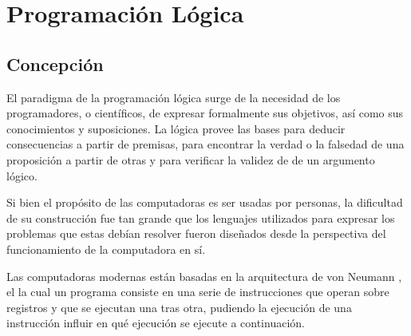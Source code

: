 \documentclass[12pt,titlepage]{article}
\begin{document}

\setcounter{page}{1}

\tableofcontents
\newpage



\clearpage	

\setlength{\parindent}{0pt}
\setlength{\parskip}{2ex plus 0.5ex minus 0.2ex}

\hypersetup{
linkcolor=red
}



\section{Programación Lógica}
\subsection{Concepción}

El paradigma de la programación lógica surge de la necesidad de los programadores, o científicos, de expresar formalmente sus objetivos, así como sus conocimientos y suposiciones. La lógica provee las bases para deducir consecuencias a partir de premisas, para encontrar la verdad o la falsedad de una proposición a partir de otras y para verificar la validez de de un argumento lógico.

Si bien el propósito de las computadoras es ser usadas por personas, la dificultad de su construcción fue tan grande que los lenguajes utilizados para expresar los problemas que estas debían resolver fueron diseñados desde la perspectiva del funcionamiento de la computadora en sí.

Las computadoras modernas están basadas en la arquitectura de von Neumann \cite{vonneumann}, el la cual un programa consiste en una serie de instrucciones que operan sobre registros y que se ejecutan una tras otra, pudiendo la ejecución de una instrucción influir en qué ejecución se ejecute a continuación.
\end{document}
